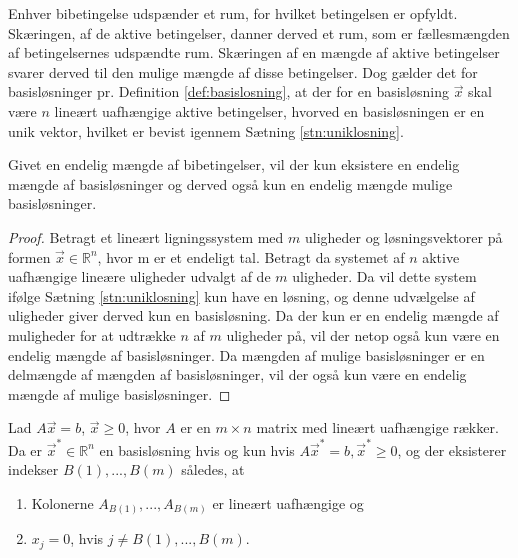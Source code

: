 Enhver bibetingelse udspænder et rum, for hvilket betingelsen er opfyldt. Skæringen, af de aktive betingelser, danner derved et rum, som er fællesmængden af betingelsernes udspændte rum. Skæringen af en mængde af aktive betingelser svarer derved til den mulige mængde af disse betingelser. Dog gælder det for basisløsninger pr. Definition \ref{def:basislosning}, at der for en basisløsning $\vec{x}$ skal være $n$ lineært uafhængige aktive betingelser, hvorved en basisløsningen er en unik vektor, hvilket er bevist igennem Sætning \ref{stn:uniklosning}. %

\begin{kor}
Givet en endelig mængde af bibetingelser, vil der kun eksistere en endelig mængde af basisløsninger og derved også kun en endelig mængde mulige basisløsninger.
\end{kor}

\begin{proof}
Betragt et lineært ligningssystem med $m$ uligheder og løsningsvektorer på formen $\vec{x} \in \mathds{R}^n$, hvor m er et endeligt tal.
	Betragt da systemet af $n$ aktive uafhængige lineære uligheder udvalgt af de $m$ uligheder. Da vil dette system ifølge Sætning \ref{stn:uniklosning} kun have en løsning, og denne udvælgelse af uligheder giver derved kun en basisløsning. Da der kun er en endelig mængde af muligheder for at udtrække $n$ af $m$ uligheder på, vil der netop også kun være en endelig mængde af basisløsninger. Da mængden af mulige basisløsninger er en delmængde af mængden af basisløsninger, vil der også kun være en endelig mængde af mulige basisløsninger.
\end{proof}

\begin{stn}
Lad $A\vec{x}=b$, $\vec{x}\geq 0$, hvor $A$ er en $m\times n$ matrix med lineært uafhængige rækker. Da er $\vec{x}^*\in \mathds{R}^n$ en basisløsning hvis og kun hvis $A\vec{x}^*=b, \vec{x}^* \geq 0$, og der eksisterer indekser $B(1), ..., B(m)$ således, at
\begin{enumerate}[label=(\alph*)]
\item Kolonerne $A_{B(1)}, ..., A_{B(m)}$ er lineært uafhængige og
\item $x_j = 0$, hvis $j \neq B(1),...,B(m)$.
\end{enumerate}
\end{stn}

